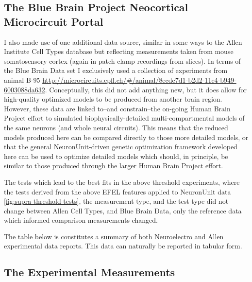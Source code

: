 \subsection{The Blue Brain Project Neocortical Microcircuit Portal}
I also made use of one additional data source, similar in some ways to the Allen Institute Cell Types database but reflecting measurements taken from mouse somatosensory cortex (again in patch-clamp recordings from slices). In terms of the Blue Brain Data set I exclusively used a collection of experiments from animal B-95 \url{http://microcircuits.epfl.ch/#/animal/8ecde7d1-b2d2-11e4-b949-6003088da632}.
Conceptually, this did not add anything new, but it does allow for high-quality optimized models to be produced from another brain region.
However, these data are linked to--and constrain--the on-going Human Brain Project effort to simulated biophysically-detailed multi-compartmental models of the same neurons (and whole neural circuits).
This means that the reduced models produced here can be compared directly to those more detailed models, or that the general NeuronUnit-driven genetic optimization framework developed here can be used to optimize detailed models which should, in principle, be similar to those produced through the larger Human Brain Project effort.

The tests which lead to the best fits in the above threshold experiments, where the tests derived from the above EFEL features applied to NeuronUnit data \ref{fig:supra-threshold-tests}, the measurement type, and the test type did not change between Allen Cell Types, and Blue Brain Data, only the reference data which informed comparison measurements changed.



The table below is constitutes a summary of both Neuroelectro and Allen experimental data reports. This data can naturally be reported in tabular form. 

\subsection{The Experimental Measurements}

